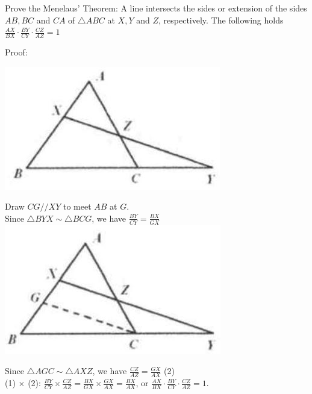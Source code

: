 \documentclass{article}
\begin{document}
Prove the Menelaus' Theorem: A line intersects the sides or extension of the sides \(A B, B C\) and \(C A\) of \(\triangle A B C\) at \(X, Y\) and \(Z\), respectively. The following holds \(\frac{A X}{B X} \cdot \frac{B Y}{C Y} \cdot \frac{C Z}{A Z}=1\)

Proof:
\begin{center}
\includegraphics[width=\textwidth]{images/117(1).jpg}
\end{center}

Draw \(C G / / X Y\) to meet \(A B\) at \(G\).\\
Since \(\triangle B Y X \sim \triangle B C G\), we have \(\frac{B Y}{C Y}=\frac{B X}{G X}\)\\
\centering
\includegraphics[width=\textwidth]{images/117(2).jpg}

Since \(\triangle A G C \sim \triangle A X Z\), we have \(\frac{C Z}{A Z}=\frac{G X}{A X}\) (2)\\
(1) \(\times\) (2): \(\frac{B Y}{C Y} \times \frac{C Z}{A Z}=\frac{B X}{G X} \times \frac{G X}{A X}=\frac{B X}{A X}\), or \(\frac{A X}{B X} \cdot \frac{B Y}{C Y} \cdot \frac{C Z}{A Z}=1\).
\end{document}

